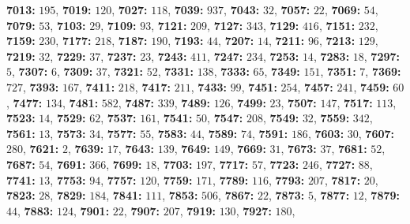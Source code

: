\textsf{\bfseries 7013:} $195$, \textsf{\bfseries 7019:} $120$, \textsf{\bfseries 7027:} $118$, \textsf{\bfseries 7039:} $937$, \textsf{\bfseries 7043:} $32$, \textsf{\bfseries 7057:} $22$, \textsf{\bfseries 7069:} $54$, \textsf{\bfseries 7079:} $53$, \textsf{\bfseries 7103:} $29$, \textsf{\bfseries 7109:} $93$, \textsf{\bfseries 7121:} $209$, \textsf{\bfseries 7127:} $343$, \textsf{\bfseries 7129:} $416$, \textsf{\bfseries 7151:} $232$, \textsf{\bfseries 7159:} $230$, \textsf{\bfseries 7177:} $218$, \textsf{\bfseries 7187:} $190$, \textsf{\bfseries 7193:} $44$, \textsf{\bfseries 7207:} $14$, \textsf{\bfseries 7211:} $96$, \textsf{\bfseries 7213:} $129$, \textsf{\bfseries 7219:} $32$, \textsf{\bfseries 7229:} $37$, \textsf{\bfseries 7237:} $23$, \textsf{\bfseries 7243:} $411$, \textsf{\bfseries 7247:} $234$, \textsf{\bfseries 7253:} $14$, \textsf{\bfseries 7283:} $18$, \textsf{\bfseries 7297:} $5$, \textsf{\bfseries 7307:} $6$, \textsf{\bfseries 7309:} $37$, \textsf{\bfseries 7321:} $52$, \textsf{\bfseries 7331:} $138$, \textsf{\bfseries 7333:} $65$, \textsf{\bfseries 7349:} $151$, \textsf{\bfseries 7351:} $7$, \textsf{\bfseries 7369:} $727$, \textsf{\bfseries 7393:} $167$, \textsf{\bfseries 7411:} $218$, \textsf{\bfseries 7417:} $211$, \textsf{\bfseries 7433:} $99$, \textsf{\bfseries 7451:} $254$, \textsf{\bfseries 7457:} $241$, \textsf{\bfseries 7459:} $60$, \textsf{\bfseries 7477:} $134$, \textsf{\bfseries 7481:} $582$, \textsf{\bfseries 7487:} $339$, \textsf{\bfseries 7489:} $126$, \textsf{\bfseries 7499:} $23$, \textsf{\bfseries 7507:} $147$, \textsf{\bfseries 7517:} $113$, \textsf{\bfseries 7523:} $14$, \textsf{\bfseries 7529:} $62$, \textsf{\bfseries 7537:} $161$, \textsf{\bfseries 7541:} $50$, \textsf{\bfseries 7547:} $208$, \textsf{\bfseries 7549:} $32$, \textsf{\bfseries 7559:} $342$, \textsf{\bfseries 7561:} $13$, \textsf{\bfseries 7573:} $34$, \textsf{\bfseries 7577:} $55$, \textsf{\bfseries 7583:} $44$, \textsf{\bfseries 7589:} $74$, \textsf{\bfseries 7591:} $186$, \textsf{\bfseries 7603:} $30$, \textsf{\bfseries 7607:} $280$, \textsf{\bfseries 7621:} $2$, \textsf{\bfseries 7639:} $17$, \textsf{\bfseries 7643:} $139$, \textsf{\bfseries 7649:} $149$, \textsf{\bfseries 7669:} $31$, \textsf{\bfseries 7673:} $37$, \textsf{\bfseries 7681:} $52$, \textsf{\bfseries 7687:} $54$, \textsf{\bfseries 7691:} $366$, \textsf{\bfseries 7699:} $18$, \textsf{\bfseries 7703:} $197$, \textsf{\bfseries 7717:} $57$, \textsf{\bfseries 7723:} $246$, \textsf{\bfseries 7727:} $88$, \textsf{\bfseries 7741:} $13$, \textsf{\bfseries 7753:} $94$, \textsf{\bfseries 7757:} $120$, \textsf{\bfseries 7759:} $171$, \textsf{\bfseries 7789:} $116$, \textsf{\bfseries 7793:} $207$, \textsf{\bfseries 7817:} $20$, \textsf{\bfseries 7823:} $28$, \textsf{\bfseries 7829:} $184$, \textsf{\bfseries 7841:} $111$, \textsf{\bfseries 7853:} $506$, \textsf{\bfseries 7867:} $22$, \textsf{\bfseries 7873:} $5$, \textsf{\bfseries 7877:} $12$, \textsf{\bfseries 7879:} $44$, \textsf{\bfseries 7883:} $124$, \textsf{\bfseries 7901:} $22$, \textsf{\bfseries 7907:} $207$, \textsf{\bfseries 7919:} $130$, \textsf{\bfseries 7927:} $180$, 
